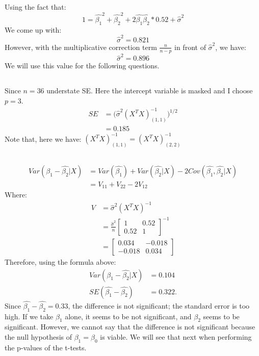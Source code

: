 \documentclass[11pt]{article}\usepackage[]{graphicx}\usepackage[]{color}
\begin{document}
\subsection{}
Using the fact that:
\begin{equation}
1=\hat{\beta_1}^2+\hat{\beta_2}^2+2\hat{\beta_1}\hat{\beta_2}*0.52+\hat{\sigma}^2
\end{equation}
We come up with:
\begin{equation}
\hat{\sigma}^2 = 0.821
\end{equation}
However, with the multiplicative correction term $ \frac{n}{n-p}$ in front of $\hat{\sigma}^2$,  we have:
\begin{equation}
\hat{\sigma}^2 = 0.896
\end{equation}
We will use this value for the following questions.

\subsection{}
Since $n=36$ understate SE. Here the intercept variable is masked and I choose $p = 3$.
\begin{align}
SE &= \bigg(\hat{\sigma}^2 (X^TX)^{-1}_{(1,1)} \bigg)^{1/2} \\
&= 0.185
\end{align}
Note that, here we have: $(X^TX)^{-1}_{(1,1)}=(X^TX)^{-1}_{(2,2)}$

\subsection{}
\begin{align}
Var(\hat{\beta_1}-\hat{\beta_2}|X) &= Var(\hat{\beta_1})+Var(\hat{\beta_2}|X)-2Cov(\hat{\beta_1},\hat{\beta_2}|X) \\
&= V_{11}+V_{22}-2V_{12}
\end{align}
Where:
\begin{align}
V &= \hat{\sigma}^2(X^TX)^{-1} \\
&= \frac{\hat{\sigma}^2}{n}\begin{bmatrix} 1&0.52\\ 0.52&1 \end{bmatrix}^{-1} \\
&= \begin{bmatrix} 0.034&-0.018\\ -0.018&0.034 \end{bmatrix}
\end{align}
Therefore, using the formula above:
\begin{align}
Var(\hat{\beta_1}-\hat{\beta_2}|X) &= 0.104\\
SE(\hat{\beta_1}-\hat{\beta_2})&=0.322.
\end{align}
Since $\hat{\beta_1}-\hat{\beta_2} = 0.33$, the difference is not significant; the standard error is too high. 
If we take $\beta_1$ alone, it seems to be not significant, and $\beta_2$ seems to be significant. However, we cannot say that the difference is not significant because the null hypothesis of $\beta_1=\beta_0$ is viable. We will see that next when performing the p-values of the t-tests.
\end{document}
